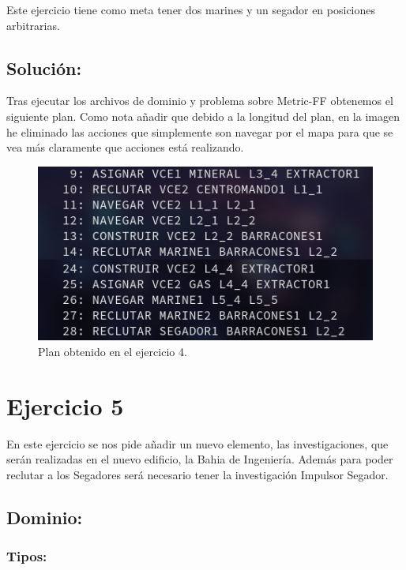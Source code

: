 \documentclass[10pt, spanish]{article}
\begin{document}
Este ejercicio tiene como meta tener dos marines y un segador en posiciones arbitrarias.

\subsection{Solución:}

Tras ejecutar los archivos de dominio y problema sobre Metric-FF obtenemos el siguiente plan. Como nota añadir que debido a la longitud del plan, en la imagen he eliminado las acciones que simplemente son navegar por el mapa para que se vea más claramente que acciones está realizando.

\begin{figure}[H]
	\centering
	\includegraphics[scale=0.4]{plan4.png}
	\caption{Plan obtenido en el ejercicio 4.}
	\label{plan4}
\end{figure}








\section{Ejercicio 5}

En este ejercicio se nos pide añadir un nuevo elemento, las investigaciones, que serán realizadas en el nuevo edificio, la Bahia de Ingeniería. Además para poder reclutar a los Segadores será necesario tener la investigación Impulsor Segador.

\subsection{Dominio:}

\subsubsection{Tipos:}
\end{document}
